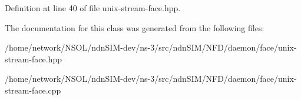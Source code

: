 Definition at line 40 of file unix-\/stream-\/face.\+hpp.



The documentation for this class was generated from the following files\+:\begin{DoxyCompactItemize}
\item 
/home/network/\+N\+S\+O\+L/ndn\+S\+I\+M-\/dev/ns-\/3/src/ndn\+S\+I\+M/\+N\+F\+D/daemon/face/unix-\/stream-\/face.\+hpp\item 
/home/network/\+N\+S\+O\+L/ndn\+S\+I\+M-\/dev/ns-\/3/src/ndn\+S\+I\+M/\+N\+F\+D/daemon/face/unix-\/stream-\/face.\+cpp\end{DoxyCompactItemize}
